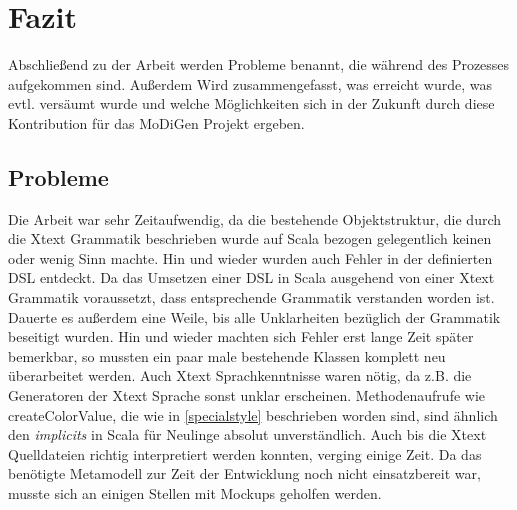 \chapter{Fazit}
Abschließend zu der Arbeit werden Probleme benannt, die während des Prozesses aufgekommen sind. Außerdem Wird zusammengefasst, was erreicht wurde, was evtl. versäumt wurde und welche Möglichkeiten sich in der Zukunft durch diese Kontribution für das MoDiGen Projekt ergeben.
\section{Probleme}
Die Arbeit war sehr Zeitaufwendig, da die bestehende Objektstruktur, die durch die Xtext Grammatik beschrieben wurde auf Scala bezogen gelegentlich keinen oder wenig Sinn machte. Hin und wieder wurden auch Fehler in der definierten DSL entdeckt. 
Da das Umsetzen einer DSL in Scala ausgehend von einer Xtext Grammatik voraussetzt, dass entsprechende Grammatik verstanden worden ist. Dauerte es außerdem eine Weile, bis alle Unklarheiten bezüglich der Grammatik beseitigt wurden. Hin und wieder machten sich Fehler erst lange Zeit später bemerkbar, so mussten ein paar male bestehende Klassen komplett neu überarbeitet werden. Auch Xtext Sprachkenntnisse waren nötig, da z.B. die Generatoren der Xtext Sprache sonst unklar erscheinen.
Methodenaufrufe wie createColorValue, die wie in \ref{specialstyle} beschrieben worden sind, sind ähnlich den \textit{implicits} in Scala für Neulinge absolut unverständlich. Auch bis die Xtext Quelldateien richtig interpretiert werden konnten, verging einige Zeit.
Da das benötigte Metamodell zur Zeit der Entwicklung noch nicht einsatzbereit war, musste sich an einigen Stellen mit Mockups geholfen werden.
